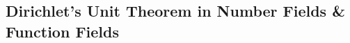 \newpage
\subsection{Dirichlet's Unit Theorem in Number Fields \& Function Fields\label{sec:620_24}}